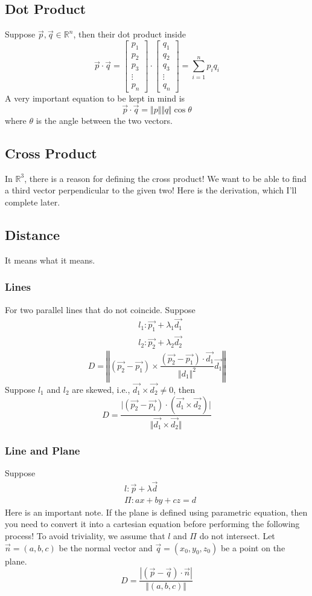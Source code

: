 \documentclass{article}
\theoremstyle{definition}
\theoremstyle{definition}
\theoremstyle{definition}
\theoremstyle{definition}
\theoremstyle{definition}
\theoremstyle{definition}
\theoremstyle{definition}
\theoremstyle{definition}
\theoremstyle{definition}
\newcommand{\RR}{\mathbb{R}}
\begin{document}
\subsection{Dot Product}
Suppose $\vec{p},\vec{q}\in\RR^n$, then their dot product inside
\[
\vec{p}\cdot\vec{q}=\begin{bmatrix}
    p_1\\p_2\\p_3\\ \vdots\\p_n
\end{bmatrix}\cdot\begin{bmatrix}
    q_1\\q_2\\q_3\\ \vdots\\q_n
\end{bmatrix}  
=\sum_{i=1}^n p_iq_i 
\]
A very important equation to be kept in mind is 
\[\vec{p}\cdot\vec{q}=\Vert p\Vert\Vert q\Vert\cos\theta\]
where $\theta$ is the angle between the two vectors.
\subsection{Cross Product}
In $\RR^3$, there is a reason for defining the cross product! We want to be able to find a third vector perpendicular to the given two! Here is the derivation, which I'll complete later.
\subsection{Distance}
It means what it means.
\subsubsection{Lines}
For two parallel lines that do not coincide. Suppose 
\begin{align*}
    &l_1:\vec{p_1}+\lambda_1\vec{d_1}\\
    &l_2:\vec{p_2}+\lambda_2\vec{d_2}
\end{align*}
\[
D=\left\Vert(\vec{p_2}-\vec{p_1})\times \dfrac{(\vec{p_2}-\vec{p_1})\cdot \vec{d_1}}{\Vert d_1\Vert^2}\vec{d_1}\right\Vert   
\]
Suppose $l_1$ and $l_2$ are skewed, i.e., $\vec{d_1}\times\vec{d_2}\neq 0$, then
\[
D=\dfrac{\vert(\vec{p_2}-\vec{p_1})\cdot(\vec{d_1}\times\vec{d_2})\vert}{\Vert\vec{d_1}\times\vec{d_2}\Vert}    
\]
\subsubsection{Line and Plane}
Suppose 
\begin{align*}
    &l:\vec{p}+\lambda\vec{d}\\
    &\Pi:ax+by+cz=d
\end{align*}
Here is an important note. If the plane is defined using parametric equation, then you need to convert it into a cartesian equation before performing the following process!
To avoid triviality, we assume that $l$ and $\Pi$ do not intersect. Let $\vec{n}=(a,b,c)$ be the normal vector and $\vec{q}=(x_0,y_0,z_0)$ be a point on the plane.
\[
D=\dfrac{|(\vec{p}-\vec{q})\cdot\vec{n}|}{\Vert(a,b,c)\Vert}
\] 
\end{document}
